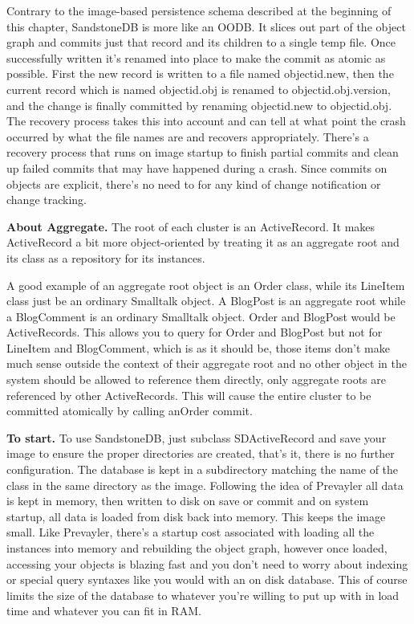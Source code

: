\documentclass[a4paper,10pt,twoside]{book}
\newcommand{\ct}[1]{{\small\ttfamily\textup{#1}}}
\begin{document}
Contrary to the image-based persistence schema described at the beginning of this chapter, SandstoneDB is more like an OODB. It slices out part of the object graph and commits just that record and its children to a single temp file. Once successfully written it's renamed into place to make the commit as atomic as possible. First the new record is written to a file named objectid.new, then the current record which is named objectid.obj is renamed to objectid.obj.version, and the change is finally committed by renaming objectid.new to objectid.obj. The recovery process takes this into account and can tell at what point the crash occurred by what the file names are and recovers appropriately. There's a recovery process that runs on image startup to finish partial commits and clean up failed commits that may have happened during a crash. Since commits on objects are explicit, there's no need to for any kind of change notification or change tracking.

\textbf{About Aggregate.} The root of each cluster is an ActiveRecord. It makes ActiveRecord a bit more object-oriented by treating it as an aggregate root and its class as a repository for its instances.

A good example of an aggregate root object is an \ct{Order} class, while its \ct{LineItem} class just be an ordinary Smalltalk object. A \ct{BlogPost} is an aggregate root while a \ct{BlogComment} is an ordinary Smalltalk object. \ct{Order} and \ct{BlogPost} would be ActiveRecords. This allows you to query for \ct{Order} and \ct{BlogPost} but not for \ct{LineItem} and \ct{BlogComment}, which is as it should be, those items don't make much sense outside the context of their aggregate root and no other object in the system should be allowed to reference them directly, only aggregate roots are referenced by other ActiveRecords. This will cause the entire cluster to be committed atomically by calling \ct{anOrder commit}.

\textbf{To start.} To use SandstoneDB, just subclass \ct{SDActiveRecord} and save your image to ensure the proper directories are created, that's it, there is no further configuration. The database is kept in a subdirectory matching the name of the class in the same directory as the image. Following the idea of Prevayler all data is kept in memory, then written to disk on save or commit and on system startup, all data is loaded from disk back into memory. This keeps the image small. Like Prevayler, there's a startup cost associated with loading all the instances into memory and rebuilding the object graph, however once loaded, accessing your objects is blazing fast and you don't need to worry about indexing or special query syntaxes like you would with an on disk database. This of course limits the size of the database to whatever you're willing to put up with in load time and whatever you can fit in RAM.
\end{document}
